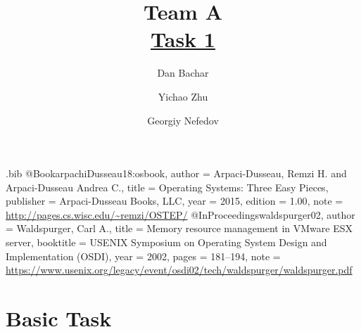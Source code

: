 \usepackage{spverbatim}

\usepackage{filecontents}
\usepackage[justification=centering]{caption}
\begin{filecontents}{\jobname.bib}
@Book{arpachiDusseau18:osbook,
  author =       {Arpaci-Dusseau, Remzi H. and Arpaci-Dusseau Andrea C.},
  title =        {Operating Systems: Three Easy Pieces},
  publisher =    {Arpaci-Dusseau Books, LLC},
  year =         2015,
  edition =      {1.00},
  note =         {\url{http://pages.cs.wisc.edu/~remzi/OSTEP/}}
}
@InProceedings{waldspurger02,
  author =       {Waldspurger, Carl A.},
  title =        {Memory resource management in {VMware ESX} server},
  booktitle =    {USENIX Symposium on Operating System Design and
                  Implementation (OSDI)},
  year =         2002,
  pages =        {181--194},
  note =         {\url{https://www.usenix.org/legacy/event/osdi02/tech/waldspurger/waldspurger.pdf}}}
\end{filecontents}



\date{}

\title{\Large \bf Team A\\  \href{https://github.com/danbachar/swiss-knife/tree/master/task1}{Task 1}}

\author{
{\rm Dan Bachar}
\and
{\rm Yichao Zhu}
\and
{\rm Georgiy Nefedov}
} %

\maketitle



\section{Basic Task}

